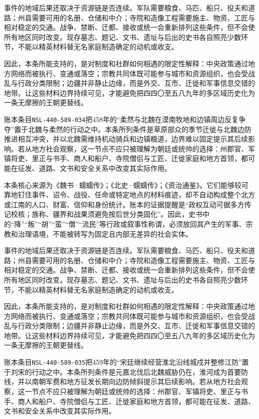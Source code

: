 事件的地域后果还取决于资源链是否连续。军队需要粮食、马匹、船只、役夫和道路；州县需要可用的名册、仓储和中介；寺院和造像工程需要施主、物资、工匠与相对稳定的交通。战争、禁断、迁都、接收或统一会重新排列这些条件，但不会使所有地区同时改变。现存墓志、题记、文书、遗址与后出的史书各自照亮少数环节，不能以精英材料替无名家庭制造确定的动机或收支。

因此，本条所能支持的，是对制度和社群如何相遇的限定性解释：中央政策通过地方网络而被执行、变通或落空；宗教共同体既可能参与城市和资源组织，也会受战乱与行政分类限制；边疆并非静止边缘，而是外交、互市、迁徙和军事信息交错的地带。让这些材料边界持续可见，才能避免把四四〇至五八九年的多区域历史化为一条无摩擦的王朝更替线。

账本条目\texttt{NSL-440-589-034}把458年的“柔然与北魏在漠南牧地和边镇周边反复争夺”置于北魏与柔然的行动之中。本条所列条件是草原部众的季节迁徙与北魏边防推进相互冲突，并以北魏需维持机动骑兵和边镇粮道，边界难以固定提示其后续影响。若从地方社会观察，这一节点不应只被理解为朝廷或统帅的选择：州郡官、军镇将吏、里正与书手、商人和船户、寺院僧侣与工匠、迁徙家庭和地方首领，都可能在征发、道路、文书和安全关系中改变其实际作用。

本条核心来源为《魏书·蠕蠕传》；《北史·蠕蠕传》；《资治通鉴》。它们能够较可靠地钉住事件、诏令、战役、任命或特定地点的材料痕迹，却不自动构成整个北方或江南的人口、财富、信仰和身份统计。账本的证据提醒是“政权互动可据多方传记校核；族称、疆界和战果须避免按后世分类固化”。因此，史书中的“降”“叛”“胡”“蛮”“僧”“流民”等行政或叙事性称谓，必须放回其产生的军事、宗教和治理语境，不能被转写为固定且内部无差异的社会实体。

事件的地域后果还取决于资源链是否连续。军队需要粮食、马匹、船只、役夫和道路；州县需要可用的名册、仓储和中介；寺院和造像工程需要施主、物资、工匠与相对稳定的交通。战争、禁断、迁都、接收或统一会重新排列这些条件，但不会使所有地区同时改变。现存墓志、题记、文书、遗址与后出的史书各自照亮少数环节，不能以精英材料替无名家庭制造确定的动机或收支。

因此，本条所能支持的，是对制度和社群如何相遇的限定性解释：中央政策通过地方网络而被执行、变通或落空；宗教共同体既可能参与城市和资源组织，也会受战乱与行政分类限制；边疆并非静止边缘，而是外交、互市、迁徙和军事信息交错的地带。让这些材料边界持续可见，才能避免把四四〇至五八九年的多区域历史化为一条无摩擦的王朝更替线。

账本条目\texttt{NSL-440-589-035}把459年的“宋廷继续经营淮北沿线城戍并整修江防”置于刘宋的行动之中。本条所列条件是元嘉北伐后北魏威胁仍在，淮河成为首要防线，并以南朝军费和地方征发长期向边防倾斜提示其后续影响。若从地方社会观察，这一节点不应只被理解为朝廷或统帅的选择：州郡官、军镇将吏、里正与书手、商人和船户、寺院僧侣与工匠、迁徙家庭和地方首领，都可能在征发、道路、文书和安全关系中改变其实际作用。

